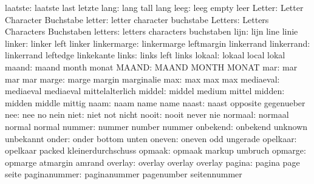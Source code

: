             laatste:  laatste              last                letzte
               lang:  lang                 tall                lang
               leeg:  leeg                 empty               leer
             Letter:  Letter               Character           Buchstabe
             letter:  letter               character           buchstabe
            Letters:  Letters              Characters          Buchstaben
            letters:  letters              characters          buchstaben
               lijn:  lijn                 line                linie
             linker:  linker               left                linker
        linkermarge:  linkermarge          leftmargin          linkerrand
         linkerrand:  linkerrand           leftedge            linkekante
              links:  links                left                links
             lokaal:  lokaal               local               lokal
              maand:  maand                month               monat
              MAAND:  MAAND                MONTH               MONAT
                mar:  mar                  mar                 mar
              marge:  marge                margin              marginalie
                max:  max                  max                 max
          mediaeval:  mediaeval            mediaeval           mittelalterlich
             middel:  middel               medium              mittel
             midden:  midden               middle              mittig
               naam:  naam                 name                name
              naast:  naast                opposite            gegenueber
                nee:  nee                  no                  nein
               niet:  niet                 not                 nicht
              nooit:  nooit                never               nie
            normaal:  normaal              normal              normal
             nummer:  nummer               number              nummer
           onbekend:  onbekend             unknown             unbekannt
              onder:  onder                bottom              unten
             oneven:  oneven               odd                 ungerade
           opelkaar:  opelkaar             packed              kleinerdurchschuss
             opmaak:  opmaak               markup              umbruch
            opmarge:  opmarge              atmargin            amrand
            overlay:  overlay              overlay             overlay
             pagina:  pagina               page                seite
       paginanummer:  paginanummer         pagenumber          seitennummer
